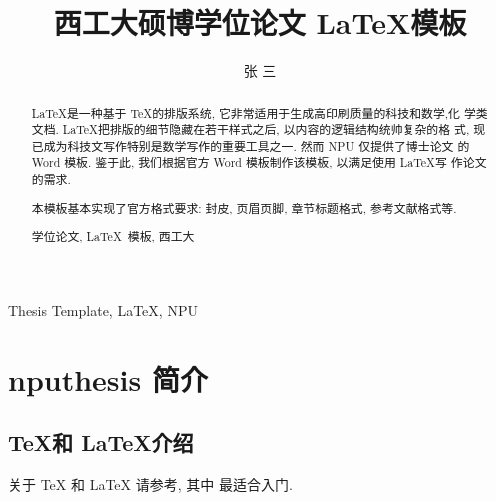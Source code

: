 \documentclass[twoside, UTF8, phd, AutoFakeBold]{nputhesis}
\title[\LaTeX\ Template of NPU Thesis]{西工大硕博学位论文 \LaTeX 模板}
\author[San Zhang]{张\,\,三}
\theoremstyle{npuplain}
\theoremstyle{nputheorem}
\begin{document}
\makecover    %

\frontmatter  %

\begin{abstract}
  \LaTeX 是一种基于 \TeX 的排版系统, 它非常适用于生成高印刷质量的科技和数学,化
  学类文档. \LaTeX 把排版的细节隐藏在若干样式之后, 以内容的逻辑结构统帅复杂的格
  式, 现已成为科技文写作特别是数学写作的重要工具之一. 然而 NPU 仅提供了博士论文
  的 Word 模板. 鉴于此, 我们根据官方 Word 模板制作该模板, 以满足使用 \LaTeX 写
  作论文的需求.

  本模板基本实现了官方格式要求: 封皮, 页眉页脚, 章节标题格式, 参考文献格式等.

  \lipsum[1-5]
  \begin{keywords}
    学位论文, \LaTeX\ 模板, 西工大
  \end{keywords}
\end{abstract}

\begin{Abstract}
  \lipsum[1-4]
  \begin{Keywords}
    Thesis Template, \LaTeX, NPU
  \end{Keywords}
\end{Abstract}

\tableofcontents    %
\printnomenclature  %

\mainmatter         %


\chapter{nputhesis 简介}

\section{\TeX 和 \LaTeX 介绍}
关于 \TeX\cite{Knuth1986} 和 \LaTeX\cite{Lamport1994} 请参考\parencite{Knuth1986,Lamport1994,Liu2013}, 
其中 \parencite{Liu2013} 最适合入门.
\end{document}
